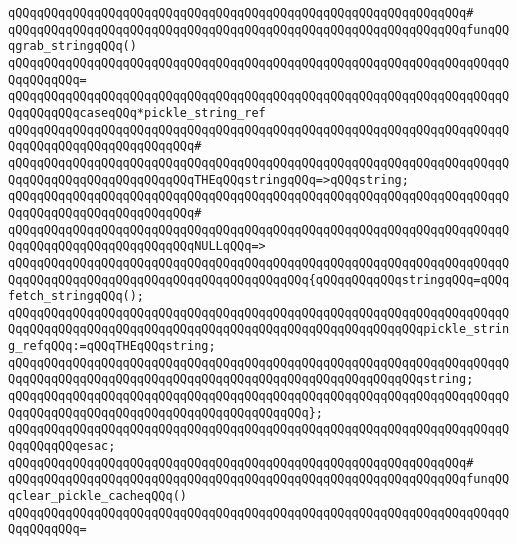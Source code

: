 \newline
\verb|qQQqqQQqqQQqqQQqqQQqqQQqqQQqqQQqqQQqqQQqqQQqqQQqqQQqqQQqqQQqqQQq#|\newline
\verb|qQQqqQQqqQQqqQQqqQQqqQQqqQQqqQQqqQQqqQQqqQQqqQQqqQQqqQQqqQQqqQQqfunqQQqgrab_stringqQQq()|\newline
\verb|qQQqqQQqqQQqqQQqqQQqqQQqqQQqqQQqqQQqqQQqqQQqqQQqqQQqqQQqqQQqqQQqqQQqqQQqqQQqqQQq=|\newline
\verb|qQQqqQQqqQQqqQQqqQQqqQQqqQQqqQQqqQQqqQQqqQQqqQQqqQQqqQQqqQQqqQQqqQQqqQQqqQQqqQQqcaseqQQq*pickle_string_ref|\newline
\verb|qQQqqQQqqQQqqQQqqQQqqQQqqQQqqQQqqQQqqQQqqQQqqQQqqQQqqQQqqQQqqQQqqQQqqQQqqQQqqQQqqQQqqQQqqQQqqQQq#|\newline
\verb|qQQqqQQqqQQqqQQqqQQqqQQqqQQqqQQqqQQqqQQqqQQqqQQqqQQqqQQqqQQqqQQqqQQqqQQqqQQqqQQqqQQqqQQqqQQqqQQqTHEqQQqstringqQQq=>qQQqstring;|\newline
\verb|qQQqqQQqqQQqqQQqqQQqqQQqqQQqqQQqqQQqqQQqqQQqqQQqqQQqqQQqqQQqqQQqqQQqqQQqqQQqqQQqqQQqqQQqqQQqqQQq#|\newline
\verb|qQQqqQQqqQQqqQQqqQQqqQQqqQQqqQQqqQQqqQQqqQQqqQQqqQQqqQQqqQQqqQQqqQQqqQQqqQQqqQQqqQQqqQQqqQQqqQQqNULLqQQq=>|\newline
\verb|qQQqqQQqqQQqqQQqqQQqqQQqqQQqqQQqqQQqqQQqqQQqqQQqqQQqqQQqqQQqqQQqqQQqqQQqqQQqqQQqqQQqqQQqqQQqqQQqqQQqqQQqqQQqqQQq{qQQqqQQqqQQqstringqQQq=qQQqfetch_stringqQQq();|\newline
\verb|qQQqqQQqqQQqqQQqqQQqqQQqqQQqqQQqqQQqqQQqqQQqqQQqqQQqqQQqqQQqqQQqqQQqqQQqqQQqqQQqqQQqqQQqqQQqqQQqqQQqqQQqqQQqqQQqqQQqqQQqqQQqqQQqpickle_string_refqQQq:=qQQqTHEqQQqstring;|\newline
\verb|qQQqqQQqqQQqqQQqqQQqqQQqqQQqqQQqqQQqqQQqqQQqqQQqqQQqqQQqqQQqqQQqqQQqqQQqqQQqqQQqqQQqqQQqqQQqqQQqqQQqqQQqqQQqqQQqqQQqqQQqqQQqqQQqstring;|\newline
\verb|qQQqqQQqqQQqqQQqqQQqqQQqqQQqqQQqqQQqqQQqqQQqqQQqqQQqqQQqqQQqqQQqqQQqqQQqqQQqqQQqqQQqqQQqqQQqqQQqqQQqqQQqqQQqqQQq};|\newline
\verb|qQQqqQQqqQQqqQQqqQQqqQQqqQQqqQQqqQQqqQQqqQQqqQQqqQQqqQQqqQQqqQQqqQQqqQQqqQQqqQQqesac;|\newline
\newline
\verb|qQQqqQQqqQQqqQQqqQQqqQQqqQQqqQQqqQQqqQQqqQQqqQQqqQQqqQQqqQQqqQQq#|\newline
\verb|qQQqqQQqqQQqqQQqqQQqqQQqqQQqqQQqqQQqqQQqqQQqqQQqqQQqqQQqqQQqqQQqfunqQQqclear_pickle_cacheqQQq()|\newline
\verb|qQQqqQQqqQQqqQQqqQQqqQQqqQQqqQQqqQQqqQQqqQQqqQQqqQQqqQQqqQQqqQQqqQQqqQQqqQQqqQQq=|\newline
